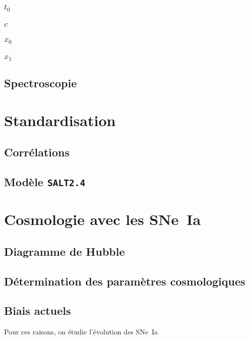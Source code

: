 \documentclass[../main/main.tex]{subfiles}
\begin{document}
\subsubsection*{$t_0$}
\subsubsection*{$c$}
\subsubsection*{$x_0$}
\subsubsection*{$x_1$}
\subsection{Spectroscopie}\label{ssec:spectro}

\section{Standardisation}\label{sec:stand}
\subsection{Corrélations}\label{ssec:corr}
\subsection{Modèle \texttt{SALT2.4}}\label{ssec:salt}

\section{Cosmologie avec les SNe~Ia}\label{sec:snecosmo}
\subsection{Diagramme de Hubble}\label{ssec:hubble}
\subsection{Détermination des paramètres cosmologiques}\label{ssec:pcosmo}
\subsection{Biais actuels}\label{ssec:biais}

Pour ces raisons, on étudie l'évolution des SNe~Ia

\newpage

\thispagestyle{plain}
\vfill
\minilof
\vfill
\minilot
\vfill


\shorthandoff{:}

\end{document}
